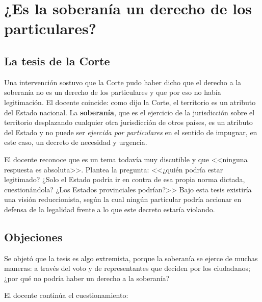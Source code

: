 \documentclass[12pt,oneside]{book}
\begin{document}
\section{¿Es la soberanía un derecho de los particulares?}

\subsection{La tesis de la Corte}

Una intervención sostuvo que la Corte pudo haber dicho que el derecho a la soberanía no es un derecho de los particulares y que por eso no había legitimación. El docente coincide: como dijo la Corte, el territorio es un atributo del Estado nacional. La \textbf{soberanía}, que es el ejercicio de la jurisdicción sobre el territorio desplazando cualquier otra jurisdicción de otros países, es un atributo del Estado y no puede ser \textit{ejercida por particulares} en el sentido de impugnar, en este caso, un decreto de necesidad y urgencia.

El docente reconoce que es un tema todavía muy discutible y que <<ninguna respuesta es absoluta>>. Plantea la pregunta: <<¿quién podría estar legitimado? ¿Solo el Estado podría ir en contra de esa propia norma dictada, cuestionándola? ¿Los Estados provinciales podrían?>> Bajo esta tesis existiría una visión reduccionista, según la cual ningún particular podría accionar en defensa de la legalidad frente a lo que este decreto estaría violando.

\subsection{Objeciones}

Se objetó que la tesis es algo extremista, porque la soberanía se ejerce de muchas maneras: a través del voto y de representantes que deciden por los ciudadanos; ¿por qué no podría haber un derecho a la soberanía?

El docente continúa el cuestionamiento:
\end{document}
